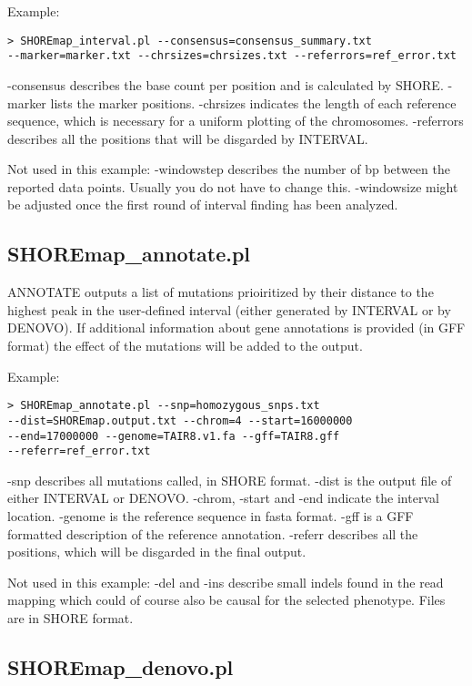 \documentclass[a4paper,10pt]{scrartcl}
\begin{document}
Example:

\begin{verbatim}
> SHOREmap_interval.pl --consensus=consensus_summary.txt 
--marker=marker.txt --chrsizes=chrsizes.txt --referrors=ref_error.txt
\end{verbatim}

-consensus describes the base count per position and is calculated by SHORE. -marker lists the marker positions. -chrsizes indicates the length of each reference sequence, which is necessary for a uniform plotting of the chromosomes. -referrors describes all the positions that will be disgarded by INTERVAL.

Not used in this example: -windowstep describes the number of bp between the reported data points. Usually you do not have to change this. -windowsize might be adjusted once the first round of interval finding has been analyzed.

\subsection{SHOREmap\_annotate.pl}

ANNOTATE outputs a list of mutations prioiritized by their distance to the highest peak in the user-defined interval (either generated by INTERVAL or by DENOVO). If additional information about gene annotations is provided (in GFF format) the effect of the mutations will be added to the output.

Example:

\begin{verbatim}
> SHOREmap_annotate.pl --snp=homozygous_snps.txt 
--dist=SHOREmap.output.txt --chrom=4 --start=16000000 
--end=17000000 --genome=TAIR8.v1.fa --gff=TAIR8.gff 
--referr=ref_error.txt
\end{verbatim}

-snp describes all mutations called, in SHORE format. -dist is the output file of either INTERVAL or DENOVO. -chrom, -start and -end indicate the interval location. -genome is the reference sequence in fasta format. -gff is a GFF formatted description of the reference annotation. -referr describes all the positions, which will be disgarded in the final output.

Not used in this example: -del and -ins describe small indels found in the read mapping which could of course also be causal for the selected phenotype. Files are in SHORE format.

\subsection{SHOREmap\_denovo.pl}
\end{document}
